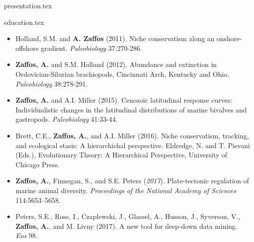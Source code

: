 \documentclass[12pt, a4paper]{awesome-cv}
\newcommand*{\sectiondir}{resume/}
\begin{document}
\makecvheader

{presentation.tex}

{education.tex}
\vspace{-20pt}

\fontsize{10pt}{1em}\bodyfontlight\upshape\color{text}
\begin{itemize}[leftmargin=*]
\item{Holland, S.M. and \textbf{A. Zaffos} (2011). Niche conservatism along an onshore-offshore gradient. \textit{Paleobiology} 37:270-286.}
\item{\textbf{Zaffos, A.} and S.M. Holland (2012). Abundance and extinction in Ordovician-Silurian brachiopods, Cincinnati Arch, Kentucky and Ohio. \textit{Paleobiology} 38:278-291.}
\item{\textbf{Zaffos, A.} and A.I. Miller (2015). Cenozoic latitudinal response curves: Individualistic changes in the latitudinal distributions of marine bivalves and gastropods. \textit{Paleobiology} 41:33-44.}
\item{Brett, C.E., \textbf{Zaffos, A.}, and A.I. Miller (2016). Niche conservatism, tracking, and ecological stasis: A hierarchichal perspective. Eldredge, N. and T. Pievani (Eds.), Evolutionary Theory: A Hierarchical Perspective, University of Chicago Press.}
\item{\textbf{Zaffos, A.}, Finnegan, S., and S.E. Peters (\textit{2017}). Plate-tectonic regulation of marine animal diversity. \textit{Proceedings of the National Academy of Sciences} 114:5653–5658.}
\item{Peters, S.E., Ross, I., Czaplewski, J., Glassel, A., Husson, J., Syverson, V., \textbf{Zaffos, A.}, and M. Livny (2017). A new tool for deep-down data mining. \textit{Eos} 98.}
\end{itemize}
\end{document}
